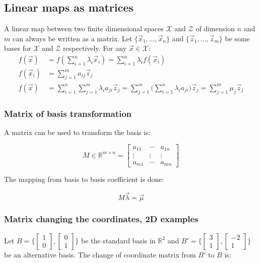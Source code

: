 	\subsection{Linear maps as matrices}
	A linear map between two finite dimensional spaces $\mathcal{X}$ and $\mathcal{Z}$ of dimension $n$ and $m$ can always be written as a matrix.
	Let $\{\vec{x}_1, \dots, \vec{x}_n\}$ and $\{\vec{z}_1, \dots, \vec{z}_m\}$ be some bases for $\mathcal{X}$ and $\mathcal{Z}$ respectively.
	For any $\vec{x}\in\mathcal{X}$:
	\begin{align*}
		f(\vec{x}) &= f(\sum\limits_{i=1}^n\lambda_i\vec{x}_i) = \sum\limits_{i = 1}^n\lambda_if(\vec{x}_i)\\
		f(\vec{x}_i) &= \sum\limits_{j=1}^ma_{ij}\vec{z}_j\\
		f(\vec{x}) &= \sum\limits_{i=1}^n\sum\limits_{j=1}^m\lambda_ia_{ji}\vec{z}_j = \sum\limits_{j=1}^m\bigl(\sum\limits_{i=1}^n\lambda_ia_{ji}\bigr)\vec{z}_j = \sum\limits_{j=1}^m\mu_j \vec{z}_j
	\end{align*}

		\subsubsection{Matrix of basis transformation}
		A matrix can be used to transform the basis is:

		$$M\in\mathbb{R}^{m\times n} = \begin{bmatrix} a_{11} & \cdots & a_{1n} \\ \vdots & \vdots & \vdots \\ a_{m1} & \cdots & a_{mn} \end{bmatrix}$$

		The mapping from basis to basis coefficient is done:

		$$M\vec{\lambda} = \vec{\mu}$$

		\subsubsection{Matrix changing the coordinates, 2D examples}
		Let $B = \biggl\{ \begin{bmatrix} 1 \\0 \end{bmatrix} , \begin{bmatrix} 0 \\ 1\end{bmatrix}\biggr\}$ be the standard basis in $\mathbb{R}^2$ and $B' = \biggl\{\begin{bmatrix} 3 \\ 1 \end{bmatrix}, \begin{bmatrix} -2 \\ 1 \end{bmatrix}\biggr\}$ be an alternative basis.
		The change of coordinate matrix from $B'$ to $B$ is:

